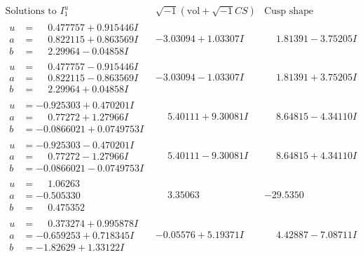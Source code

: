 \documentclass[1p]{elsarticle_modified}
\theoremstyle{definition}
\newcommand{\I}{\sqrt{-1}}
\begin{document}
$$\begin{array}{c|c|c}  
\text{Solutions to }I^u_{1}& \I (\text{vol} + \sqrt{-1}CS) & \text{Cusp shape}\\
 \hline 
\begin{aligned}
u &= \phantom{-}0.477757 + 0.915446 I \\
a &= \phantom{-}0.822115 + 0.863569 I \\
b &= \phantom{-}2.29964 - 0.04858 I\end{aligned}
 & -3.03094 + 1.03307 I & \phantom{-}1.81391 - 3.75205 I \\ \hline\begin{aligned}
u &= \phantom{-}0.477757 - 0.915446 I \\
a &= \phantom{-}0.822115 - 0.863569 I \\
b &= \phantom{-}2.29964 + 0.04858 I\end{aligned}
 & -3.03094 - 1.03307 I & \phantom{-}1.81391 + 3.75205 I \\ \hline\begin{aligned}
u &= -0.925303 + 0.470201 I \\
a &= \phantom{-}0.77272 + 1.27966 I \\
b &= -0.0866021 + 0.0749753 I\end{aligned}
 & \phantom{-}5.40111 + 9.30081 I & \phantom{-}8.64815 - 4.34110 I \\ \hline\begin{aligned}
u &= -0.925303 - 0.470201 I \\
a &= \phantom{-}0.77272 - 1.27966 I \\
b &= -0.0866021 - 0.0749753 I\end{aligned}
 & \phantom{-}5.40111 - 9.30081 I & \phantom{-}8.64815 + 4.34110 I \\ \hline\begin{aligned}
u &= \phantom{-}1.06263\phantom{ +0.000000I} \\
a &= -0.505330\phantom{ +0.000000I} \\
b &= \phantom{-}0.475352\phantom{ +0.000000I}\end{aligned}
 & \phantom{-}3.35063\phantom{ +0.000000I} & -29.5350\phantom{ +0.000000I} \\ \hline\begin{aligned}
u &= \phantom{-}0.373274 + 0.995878 I \\
a &= -0.659253 + 0.718345 I \\
b &= -1.82629 + 1.33122 I\end{aligned}
 & -0.05576 + 5.19371 I & \phantom{-}4.42887 - 7.08711 I \\ \hline\begin{aligned}

\end{aligned}
\end{array}$$
\end{document}
